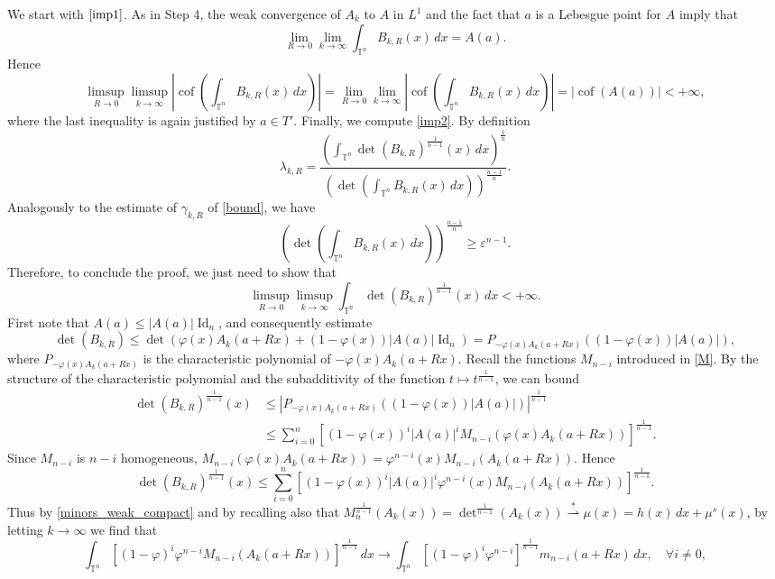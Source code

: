\documentclass[10pt,reqno]{amsart}
\numberwithin{equation}{section}
\newcommand{\weak}{\overset{*}{\rightharpoonup}}
\newcommand{\T}{\mathbb{T}}
\DeclareMathOperator{\cof}{cof}
\DeclareMathOperator{\Id}{Id}
\theoremstyle{plain}
\theoremstyle{definition}
\theoremstyle{remark}
\begin{document}
We start with $\eqref{imp1}$. As in Step 4, the weak convergence of $A_k$ to $A$ in $L^1$ and the fact that $a$ is a Lebesgue point for $A$ imply that
\[
\lim_{R\to 0}\lim_{k \to \infty}\int_{\T^n}B_{k,R}(x)\,dx = A(a).
\]
Hence
\[
\limsup_{R\to 0}\limsup_{k\to \infty}\left|\cof\left(\int_{\T^n}B_{k,R}(x)\,dx\right)\right| = \lim_{R\to 0}\lim_{k\to \infty}\left|\cof\left(\int_{\T^n}B_{k,R}(x)\,dx\right)\right| =  |\cof(A(a))| < + \infty,
\]
where the last inequality is again justified by $a \in T'$. Finally, we compute \eqref{imp2}. By definition
\[
\displaystyle\lambda_{k,R}=\frac{\left(\int_{\T^n}\det(B_{k,R})^{\frac{1}{ n - 1}}(x)\,dx\right)^{\frac{1}{n}}}{\left(\det(\int_{\T^n}B_{k,R}(x)\,dx)\right)^{\frac{n - 1}{n}}}.
\]
Analogously to the estimate of $\gamma_{k,R}$ of \eqref{bound}, we have
\[
\left(\det\left(\int_{\T^n}B_{k,R}(x)\,dx\right)\right)^{\frac{n - 1}{n}} \ge \varepsilon^{n - 1}.
\]
Therefore, to conclude the proof, we just need to show that
\[
\limsup_{R \to 0} \limsup_{k \to \infty} \int_{\T^n}\det(B_{k,R})^{\frac{1}{ n - 1}}(x)\,dx < +\infty.
\]
First note that $A(a) \le |A(a)|\Id_n$, and consequently estimate
\[
\det(B_{k,R}) \le \det(\varphi(x)A_k(a+Rx) + (1 -\varphi(x))|A(a)|\Id_n) = P_{-\varphi(x) A_k(a + Rx)}((1 - \varphi(x))|A(a)|),
\]
where $P_{-\varphi(x) A_k(a + Rx)}$ is the characteristic polynomial of $-\varphi(x) A_k(a + Rx)$. Recall the functions $M_{n-i}$ introduced in \eqref{M}. By the structure of the characteristic polynomial and the subadditivity of the function $t \mapsto t^{\frac{1}{n - 1}}$, we can bound
\begin{align*}
\det(B_{k,R})^\frac{1}{n - 1}(x) &\le |P_{-\varphi(x) A_k(a + Rx)}((1 - \varphi(x))|A(a)|)|^{\frac{1}{n - 1}} \\
&\le \sum_{i = 0}^n\left[(1 - \varphi(x))^i|A(a)|^iM_{n - i}(\varphi(x) A_k(a + Rx))\right]^{\frac{1}{n - 1}}.
\end{align*}
Since $M_{n - i}$ is $n - i$ homogeneous, $M_{n - i}(\varphi(x) A_k(a + Rx)) = \varphi^{n - i}(x)M_{n - i}(A_k(a + Rx))$. Hence
\[
\det(B_{k,R})^\frac{1}{n - 1}(x) \le \sum_{i = 0}^n\left[(1 - \varphi(x))^i|A(a)|^i\varphi^{n - i}(x)M_{n - i}(A_k(a + Rx))\right]^{\frac{1}{ n -1}}.
\]
Thus by \eqref{minors_weak_compact} and by recalling also that $M_n^{\frac{1}{n-1}}(A_k(x))=\det^{\frac{1}{n-1}}(A_k(x))\weak \mu(x)=h(x)\,dx+\mu^s(x)$, by letting $k\rightarrow \infty$ we find that 
\[
\int_{\T^n}\left[(1 - \varphi)^i\varphi^{n - i}M_{n - i}(A_k(a + Rx))\right]^{\frac{1}{ n -1}}\,dx \to \int_{\T^n}\left[(1 - \varphi)^i\varphi^{n - i}\right]^{\frac{1}{n - 1}}m_{n-i}(a+Rx)\,dx,\quad \forall i\neq 0,
\]
\end{document}
